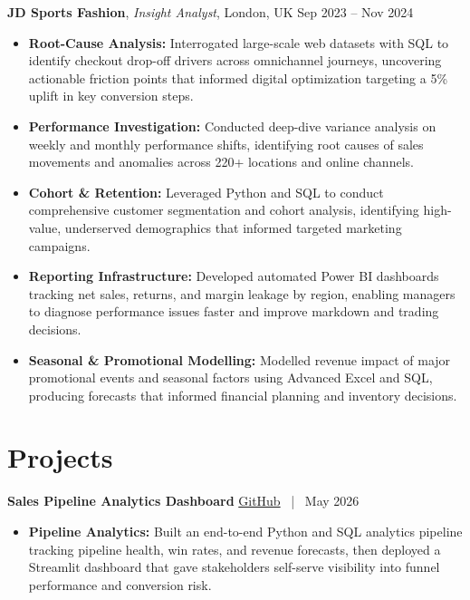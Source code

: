 \documentclass[10pt, a4paper]{article}
\begin{document}
\vspace{4pt}

\textbf{JD Sports Fashion}, \textit{Insight Analyst}, London, UK \hfill Sep 2023 -- Nov 2024
\begin{itemize}
    \item \textbf{Root-Cause Analysis:} Interrogated large-scale web datasets with SQL to identify checkout drop-off drivers across omnichannel journeys, uncovering actionable friction points that informed digital optimization targeting a 5\% uplift in key conversion steps.
    \item \textbf{Performance Investigation:} Conducted deep-dive variance analysis on weekly and monthly performance shifts, identifying root causes of sales movements and anomalies across 220+ locations and online channels.
    \item \textbf{Cohort \& Retention:} Leveraged Python and SQL to conduct comprehensive customer segmentation and cohort analysis, identifying high-value, underserved demographics that informed targeted marketing campaigns.
    \item \textbf{Reporting Infrastructure:} Developed automated Power BI dashboards tracking net sales, returns, and margin leakage by region, enabling managers to diagnose performance issues faster and improve markdown and trading decisions.
    \item \textbf{Seasonal \& Promotional Modelling:} Modelled revenue impact of major promotional events and seasonal factors using Advanced Excel and SQL, producing forecasts that informed financial planning and inventory decisions.
\end{itemize}

\section*{Projects}

\textbf{Sales Pipeline Analytics Dashboard} \hfill \href{https://github.com/VishalP44/sales-pipeline-analytics}{GitHub} \, | \, May 2026
\begin{itemize}
    \item \textbf{Pipeline Analytics:} Built an end-to-end Python and SQL analytics pipeline tracking pipeline health, win rates, and revenue forecasts, then deployed a Streamlit dashboard that gave stakeholders self-serve visibility into funnel performance and conversion risk.
\end{itemize}

\vspace{4pt}
\end{document}
